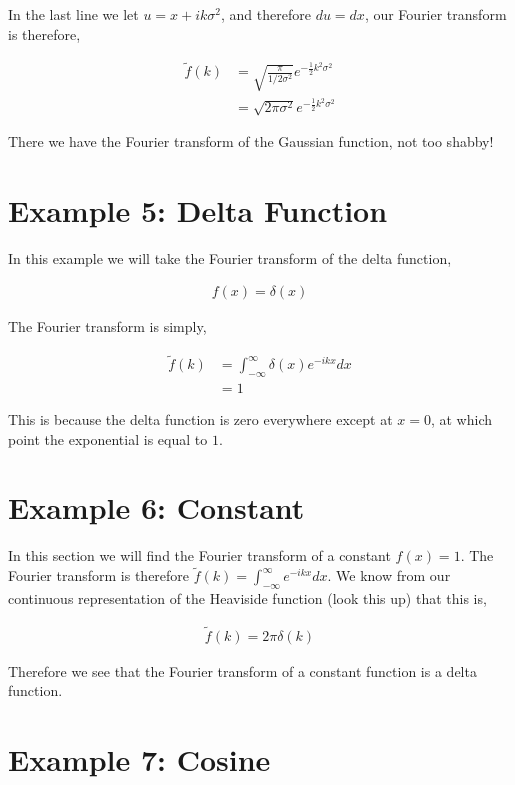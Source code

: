 \documentclass[11pt]{amsart}
\begin{document}
In the last line we let $u = x + ik\sigma^2$, and therefore $du = dx$, our Fourier transform is therefore,

\begin{align*}
  \tilde{f}(k) &= \sqrt{\frac{\pi}{1/2\sigma^2}} e^{-\frac{1}{2}k^2\sigma^2} \\
               &= \sqrt{2\pi\sigma^2} e^{-\frac{1}{2}k^2\sigma^2}
\end{align*}

There we have the Fourier transform of the Gaussian function, not too shabby!

\section{Example 5: Delta Function}

In this example we will take the Fourier transform of the delta function,

\begin{align*}
  f(x) = \delta(x)
\end{align*}

The Fourier transform is simply,

\begin{align*}
  \tilde{f}(k) &= \int_{-\infty}^{\infty} \delta(x) e^{-ikx} dx \\
               &= 1
\end{align*}

This is because the delta function is zero everywhere except at $x = 0$, at which point the exponential is equal to $1$.

\section{Example 6: Constant}

In this section we will find the Fourier transform of a constant $f(x) = 1$. The Fourier transform is therefore $\tilde{f}(k) = \int_{-\infty}^{\infty} e^{-ikx} dx$. We know from our continuous representation of the Heaviside function (look this up) that this is,

\begin{align*}
  \tilde{f}(k) = 2\pi\delta(k)
\end{align*}

Therefore we see that the Fourier transform of a constant function is a delta function.

\section{Example 7: Cosine}
\end{document}
